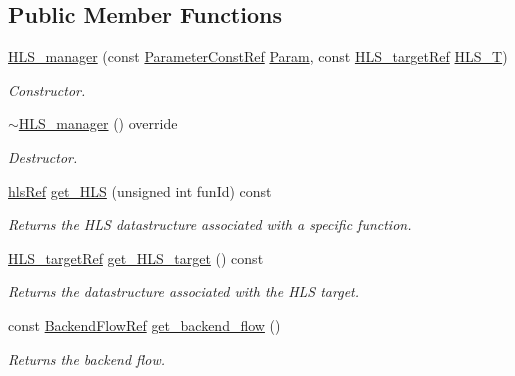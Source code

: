 \subsection*{Public Member Functions}
\begin{DoxyCompactItemize}
\item 
\hyperlink{classHLS__manager_aa1e62cc57b722b661605ea798812ab79}{H\+L\+S\+\_\+manager} (const \hyperlink{Parameter_8hpp_a37841774a6fcb479b597fdf8955eb4ea}{Parameter\+Const\+Ref} \hyperlink{classapplication__manager_ae975e0d3da59a3180f343fa936d72353}{Param}, const \hyperlink{hls__target_8hpp_a390f1d55d3b31739665ff2776abe2a3f}{H\+L\+S\+\_\+target\+Ref} \hyperlink{classHLS__manager_ac138185e1aa74471d0a571287a60870b}{H\+L\+S\+\_\+T})
\begin{DoxyCompactList}\small\item\em Constructor. \end{DoxyCompactList}\item 
\hyperlink{classHLS__manager_a2ec17f0c6f719db1769935ef838105d1}{$\sim$\+H\+L\+S\+\_\+manager} () override
\begin{DoxyCompactList}\small\item\em Destructor. \end{DoxyCompactList}\item 
\hyperlink{hls_8hpp_a75d0c73923d0ddfa28c4843a802c73a7}{hls\+Ref} \hyperlink{classHLS__manager_a9bf8850e21fc2d43665009fab8d3c095}{get\+\_\+\+H\+LS} (unsigned int fun\+Id) const
\begin{DoxyCompactList}\small\item\em Returns the H\+LS datastructure associated with a specific function. \end{DoxyCompactList}\item 
\hyperlink{hls__target_8hpp_a390f1d55d3b31739665ff2776abe2a3f}{H\+L\+S\+\_\+target\+Ref} \hyperlink{classHLS__manager_a8e61638717813ff15e1a5051815c111e}{get\+\_\+\+H\+L\+S\+\_\+target} () const
\begin{DoxyCompactList}\small\item\em Returns the datastructure associated with the H\+LS target. \end{DoxyCompactList}\item 
const \hyperlink{BackendFlow_8hpp_addb01ef393ed4ea8a79765c8ebfcf5a0}{Backend\+Flow\+Ref} \hyperlink{classHLS__manager_aff13fa7f6ea495bbb5979294d336edb5}{get\+\_\+backend\+\_\+flow} ()
\begin{DoxyCompactList}\small\item\em Returns the backend flow. \end{DoxyCompactList}\item 

\end{DoxyCompactItemize}
